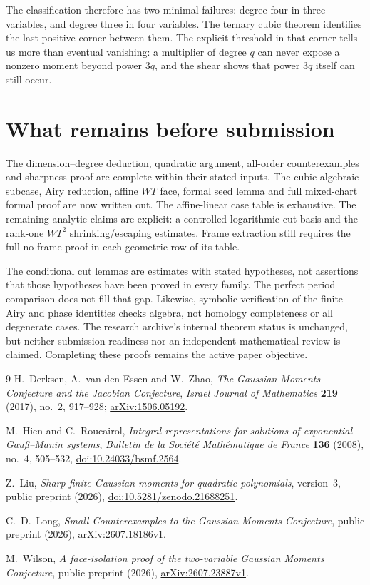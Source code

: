 \documentclass[11pt]{article}
\theoremstyle{definition}\newtheorem{definition}[theorem]{Definition}
\theoremstyle{remark}\newtheorem{remark}[theorem]{Remark}
\begin{document}
The classification therefore has two minimal failures: degree four
in three variables, and degree three in four variables. The ternary
cubic theorem identifies the last positive corner between them.
The explicit threshold in that corner tells us more than eventual
vanishing: a multiplier of degree $q$ can never expose a nonzero
moment beyond power $3q$, and the shear shows that power $3q$ itself
can still occur.

\section*{What remains before submission}
The dimension--degree deduction, quadratic argument, all-order
counterexamples and sharpness proof are complete within their stated
inputs. The cubic algebraic subcase, Airy reduction, affine $WT$ face,
formal seed lemma and full mixed-chart formal proof are now written out.
The affine-linear case table is exhaustive. The remaining analytic
claims are explicit: a controlled logarithmic cut basis and the
rank-one $WT^2$ shrinking/escaping estimates. Frame extraction still
requires the full no-frame proof in each geometric row of its table.

The conditional cut lemmas are estimates with stated hypotheses, not
assertions that those hypotheses have been proved in every family.
The perfect period comparison does not fill that gap. Likewise,
symbolic verification of the finite Airy and phase identities checks
algebra, not homology completeness or all degenerate cases. The
research archive's internal theorem status is unchanged, but neither
submission readiness nor an independent mathematical review is claimed.
Completing these proofs remains the active paper objective.

\clearpage
\begin{thebibliography}{9}
H.~Derksen, A.~van den Essen and W.~Zhao,
\emph{The Gaussian Moments Conjecture and the Jacobian Conjecture},
\emph{Israel Journal of Mathematics} \textbf{219} (2017), no.~2,
917--928; \href{https://arxiv.org/abs/1506.05192}{arXiv:1506.05192}.

M.~Hien and C.~Roucairol, \emph{Integral representations for solutions
of exponential Gau\ss--Manin systems},
\emph{Bulletin de la Soci\'et\'e Math\'ematique de France}
\textbf{136} (2008), no.~4, 505--532,
\href{https://doi.org/10.24033/bsmf.2564}{doi:10.24033/bsmf.2564}.

Z.~Liu, \emph{Sharp finite Gaussian moments for quadratic polynomials},
version~3, public preprint (2026),
\href{https://doi.org/10.5281/zenodo.21688251}{doi:10.5281/zenodo.21688251}.

C.~D.~Long, \emph{Small Counterexamples to the Gaussian Moments Conjecture},
public preprint (2026),
\href{https://arxiv.org/abs/2607.18186v1}{arXiv:2607.18186v1}.

M.~Wilson, \emph{A face-isolation proof of the two-variable Gaussian
Moments Conjecture}, public preprint (2026),
\href{https://arxiv.org/abs/2607.23887v1}{arXiv:2607.23887v1}.
\end{thebibliography}
\end{document}
